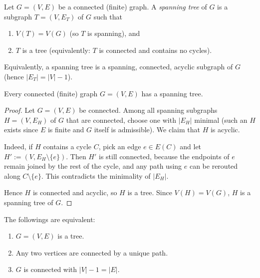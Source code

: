 \documentclass[11pt, a4paper]{ctexrep}
\begin{document}
\begin{definition}
    Let $G=(V,E)$ be a connected (finite) graph. A \emph{spanning tree} of $G$ is a subgraph
    $T=(V,E_T)$ of $G$ such that
    \begin{enumerate}
        \item $V(T)=V(G)$ (so $T$ is spanning), and
        \item $T$ is a tree (equivalently: $T$ is connected and contains no cycles).
    \end{enumerate}
    Equivalently, a spanning tree is a spanning, connected, acyclic subgraph of $G$ (hence $|E_T|=|V|-1$).
\end{definition}

\begin{proposition}
    Every connected (finite) graph $G=(V,E)$ has a spanning tree.
\end{proposition}

\begin{proof}
    Let $G=(V,E)$ be connected. Among all spanning subgraphs $H=(V,E_H)$ of $G$ that are connected,
    choose one with $|E_H|$ minimal (such an $H$ exists since $E$ is finite and $G$ itself is admissible).
    We claim that $H$ is acyclic.

    Indeed, if $H$ contains a cycle $C$, pick an edge $e\in E(C)$ and let $H':=(V,E_H\setminus\{e\})$.
    Then $H'$ is still connected, because the endpoints of $e$ remain joined by the rest of the cycle,
    and any path using $e$ can be rerouted along $C\setminus\{e\}$. This contradicts the minimality of $|E_H|$.

    Hence $H$ is connected and acyclic, so $H$ is a tree. Since $V(H)=V(G)$, $H$ is a spanning tree of $G$.
\end{proof}

\begin{theorem}
    The followings are equivalent:
    \begin{enumerate}
        \item $ G=(V,E) $ is a tree.
        \item Any two vertices are connected by a unique path.
        \item $ G $ is connected with $ |V|-1=|E| $.
    \end{enumerate}
\end{theorem}
\end{document}
